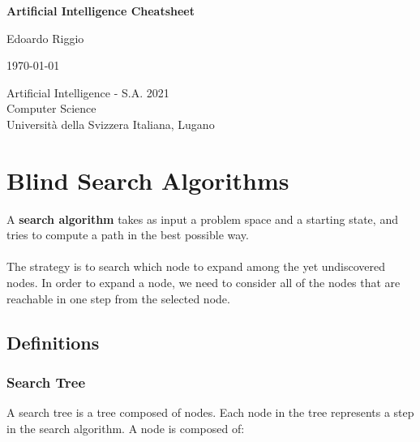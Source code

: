 \documentclass{article}
\begin{document}
\begin{titlepage}
    \begin{center}
        \vspace*{1cm}
        
        \Huge
        \textbf{Artificial Intelligence Cheatsheet}
        
        \vspace{0.5cm}
        \LARGE
        
        \vspace{.5cm}
        
        Edoardo Riggio
   		  \vspace{1.5cm}
       
        \vfill
        
        \today
        
        \vspace{.8cm}
          \Large
          Artificial Intelligence - S.A. 2021 \\
        Computer Science\\
        Universit\`{a} della Svizzera Italiana, Lugano\\
        
    \end{center}
\end{titlepage}

\tableofcontents

\newpage

\section{Blind Search Algorithms}
A \textbf{search algorithm} takes as input a problem space and a starting state, and tries to compute a path in the best possible way. \\ \\
The strategy is to search which node to expand among the yet undiscovered nodes. In order to expand a node, we need to consider all of the nodes that are reachable in one step from the selected node.

\subsection{Definitions}
\subsubsection{Search Tree}
A search tree is a tree composed of nodes. Each node in the tree represents a step in the search algorithm. A node is composed of:
\end{document}
